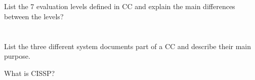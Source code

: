 \begin{questions}
\begin{parts}
  \part{} List the 7 evaluation levels defined in CC and explain the main differences between the levels?
  \part{} List the three different system documents part of a CC and describe their main purpose.
  \end{parts}

\question{} What is CISSP?\@
\end{questions}

